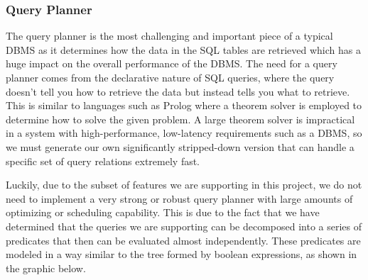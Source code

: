 \documentclass[letterpaper, 12pt]{article}
\begin{document}
\subsubsection{Query Planner}
The query planner is the most challenging and important piece of a typical DBMS as it
determines how the data in the SQL tables are retrieved which has a huge impact on 
the overall performance of the DBMS. The need for a query planner comes from the 
declarative nature of SQL queries, where the query doesn't tell you how to retrieve the
data but instead tells you what to retrieve. This is similar to languages such as Prolog where
a theorem solver is employed to determine how to solve the given problem. A large theorem 
solver is impractical in a system with high-performance, low-latency requirements such as 
a DBMS, so we must generate our own significantly stripped-down version that can handle a 
specific set of query relations extremely fast.
\par\vspace{\baselineskip}
Luckily, due to the subset of features we are supporting in this project, we do not need to 
implement a very strong or robust query planner with large amounts of optimizing or scheduling 
capability. This is due to the fact that we have determined that the queries we are supporting
can be decomposed into a series of predicates that then can be evaluated almost independently.
These predicates are modeled in a way similar to the tree formed by boolean expressions, as shown
in the graphic below.

\end{document}
